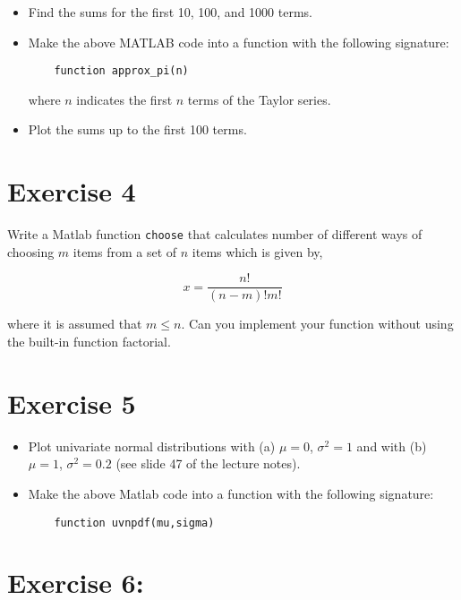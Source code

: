 \documentclass{article}
\begin{document}
\begin{itemize}

\item Find the sums for the first 10, 100, and 1000 terms. 

\item Make the above MATLAB code into a function with the following signature:
%
\begin{verbatim}  
    function approx_pi(n)
\end{verbatim} 
%
where $n$ indicates the first $n$ terms of the Taylor series. 

\item Plot the sums up to the first 100 terms.
\end{itemize}

\section*{Exercise 4}

Write a Matlab function \texttt{choose} that calculates number of different ways of choosing $m$ items from a set of $n$ items which is given by,

\begin{equation*}
x = \frac{n!}{(n-m)!m!}
\end{equation*}


where it is assumed that $m \le n$. Can you implement your function without using the built-in function factorial. 

\section*{Exercise 5}

\begin{itemize}

\item Plot univariate normal distributions with (a) $\mu = 0$, $\sigma^2 = 1$ and with (b) $\mu = 1$, $\sigma^2 = 0.2$ (see slide 47 of the lecture notes).

\item Make the above Matlab code into a function with the following signature: 
%
\begin{verbatim} 
    function uvnpdf(mu,sigma)
\end{verbatim}

\end{itemize}


\section*{Exercise 6:}
\end{document}
